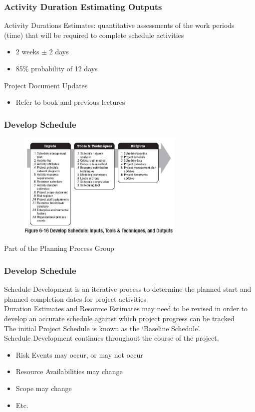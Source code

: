 \begin{frame}
\frametitle{Activity Duration Estimating \hfill Outputs}
Activity Durations Estimates: quantitative assessments of the work periods (time) that will be required to complete schedule activities
\begin{itemize}
	\item 2 weeks $\pm$ 2 days
	\item 85\% probability of 12 days
\end{itemize}
Project Document Updates
\begin{itemize}
	\item Refer to book and previous lectures
\end{itemize}
\end{frame}




\begin{frame}
\frametitle{Develop Schedule}
\begin{figure}
	\centering
		\includegraphics[width = 8cm]{images/Fig6-16.jpg}
	\label{fig:6-16}
\end{figure}
Part of the Planning Process Group
\end{frame}




\begin{frame}
\frametitle{Develop Schedule}
Schedule Development is an iterative process to determine the planned start and planned completion dates for project activities\\
Duration Estimates and Resource Estimates may need to be revised in order to develop an accurate schedule against which project progress can be tracked\\
The initial Project Schedule is known as the `Baseline Schedule'.\\
Schedule Development continues throughout the course of the project.
\begin{itemize}
	\item Risk Events may occur, or may not occur
	\item Resource Availabilities may change
	\item Scope may change
	\item Etc.
\end{itemize}
\end{frame}




